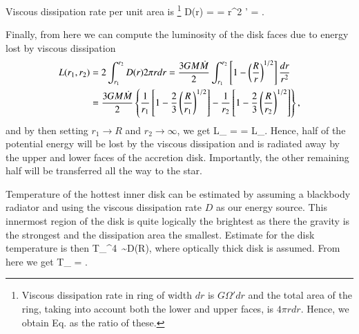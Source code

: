 Viscous dissipation rate per unit area is%
\footnote{Viscous dissipation rate in ring of width $dr$ is $G \Omega' dr$ and the total area of the ring, taking into account both the lower and upper faces, is $4\pi r dr$. Hence, we obtain Eq.  as the ratio of these.
}
\be\label{eq:D}
D(r) =  =  \nu \Sigma r^2 \Omega' =  .
\ee

Finally, from here we can compute the luminosity of the disk faces due to energy lost by viscous dissipation
\begin{align}\begin{split}
    L(r_1, r_2)  &= 2 \int_{r_1}^{r_2} D(r) 2\pi r dr = \frac{3 G M \dot{M}}{2} \int_{r_1}^{r_2} \left[ 1 - \left( \frac{R}{r} \right)^{1/2} \right] \frac{dr}{r^2} \\
 & = \frac{3 G M \dot{M}}{2} \left\{ \frac{1}{r_1} \left[ 1 - \frac{2}{3}\left( \frac{R}{r_1} \right)^{1/2} \right] -  \frac{1}{r_2} \left[ 1 - \frac{2}{3}\left( \frac{R}{r_2} \right)^{1/2} \right] \right\}, 
\end{split}\end{align}
and by then setting $r_1 \rightarrow R$ and $r_2 \rightarrow \infty$, we get
\be
L_{} =  =  L_{}.
\ee
Hence, half of the potential energy will be lost by the viscous dissipation and is radiated away by the upper and lower faces of the accretion disk.
Importantly, the other remaining half will be transferred all the way to the star.

Temperature of the hottest inner disk can be estimated by assuming a blackbody radiator and using the viscous dissipation rate $D$ as our energy source.
This innermost region of the disk is quite logically the brightest as there the gravity is the strongest and the dissipation area the smallest.
Estimate for the disk temperature is then 
\be
\sigma T_{}^4 \sim D(R),
\ee
where optically thick disk is assumed.
From here we get
\be
T_{} = .
\ee


%


